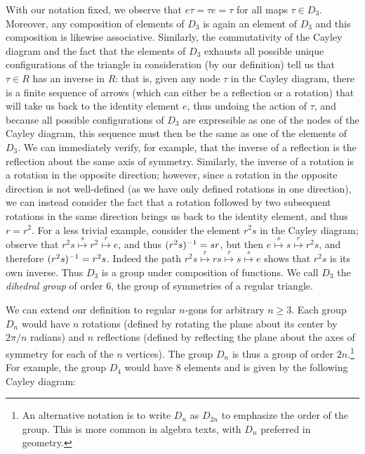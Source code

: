\begin{example}
    With our notation fixed, we observe that \(e \tau = \tau  e = \tau\) for all
    maps \(\tau \in D_3\). Moreover, any composition of elements of \(D_3\) is
    again an element of \(D_3\) and this composition is likewise associative.
    Similarly, the commutativity of the Cayley diagram and the fact that the
    elements of \(D_3\) exhausts all possible unique configurations of the
    triangle in consideration (by our definition) tell us that \(\tau \in R\)
    has an inverse in \(R\): that is, given any node \(\tau\) in the Cayley
    diagram, there is a finite sequence of arrows (which can either be a
    reflection or a rotation) that will take us back to the identity element
    \(e\), thus undoing the action of \(\tau\), and because all possible
    configurations of \(D_3\) are expressible as one of the nodes of the Cayley
    diagram, this sequence must then be the same as one of the elements of
    \(D_3\). We can immediately verify, for example, that the inverse of a
    reflection is the reflection about the same axis of symmetry. Similarly, the
    inverse of a rotation is a rotation in the opposite direction; however,
    since a rotation in the opposite direction is not well-defined (as we have
    only defined rotations in one direction), we can instead consider the fact
    that a rotation followed by two subsequent rotations in the same direction
    brings us back to the identity element, and thus \(r = r^2\). For a less
    trivial example, consider the element \(r^2s\) in the Cayley diagram;
    observe that \(r^2s \overset{s}{\mapsto} r^2 \overset{r}{\mapsto} e\), and
    thus \((r^2s)\inv = sr\), but then \(e \overset{s}{\mapsto} s
    \overset{r}{\mapsto} r^2s\), and therefore \((r^2s)\inv = r^2s\). Indeed the
    path \(r^2s \overset{r}{\mapsto} rs \overset{r}{\mapsto} s
    \overset{s}{\mapsto} e\) shows that \(r^2s\) is its own inverse. Thus
    \(D_3\) is a group under composition of functions. We call \(D_3\) the
    \emph{dihedral group} of order \(6\), the group of symmetries of a regular
    triangle. 

    We can extend our definition to regular \(n\)-gons for arbitrary \(n \geq
    3\). Each group \(D_n\) would have \(n\) rotations (defined by rotating the
    plane about its center by \(2\pi/n\) radians) and \(n\) reflections (defined
    by reflecting the plane about the axes of symmetry for each of the \(n\)
    vertices). The group \(D_n\) is thus a group of order \(2n\).\footnote{An
    alternative notation is to write \(D_n\) as \(D_{2n}\) to emphasize the
    order of the group. This is more common in algebra texts, with \(D_n\)
    preferred in geometry.} For example, the group \(D_4\) would have \(8\)
    elements and is given by the following Cayley diagram:
    \begin{center}
        \begin{tikzpicture}[ vertex/.style={circle, draw=black, minimum
            size=0.85cm}, edge/.style={->, >=Stealth, thick},
            double/.style={<->, >=Stealth, thick}, every
            node/.style={font=\small} ]
        

\end{tikzpicture}
\end{center}
\end{example}
